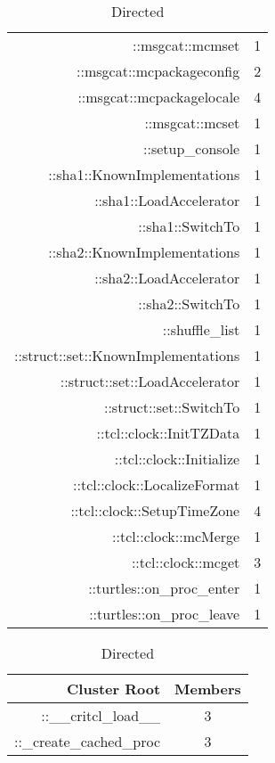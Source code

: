 \documentclass{article}[letter,10pt]
\begin{document}
{{{\begin{table}[htb]
\begin{subtable}[t]{0.48\textwidth}
{\begin{tabular}[t]{r|c}
              ::msgcat::mcmset  & 1 \\
              ::msgcat::mcpackageconfig  & 2 \\
              ::msgcat::mcpackagelocale  & 4 \\
              ::msgcat::mcset  & 1 \\
              ::setup\_console  & 1 \\
              ::sha1::KnownImplementations  & 1 \\
              ::sha1::LoadAccelerator  & 1 \\
              ::sha1::SwitchTo  & 1 \\
              ::sha2::KnownImplementations  & 1 \\
              ::sha2::LoadAccelerator  & 1 \\
              ::sha2::SwitchTo  & 1 \\
              ::shuffle\_list  & 1 \\
              ::struct::set::KnownImplementations  & 1 \\
              ::struct::set::LoadAccelerator  & 1 \\
              ::struct::set::SwitchTo  & 1 \\
              ::tcl::clock::InitTZData  & 1 \\
              ::tcl::clock::Initialize  & 1 \\
              ::tcl::clock::LocalizeFormat  & 1 \\
              ::tcl::clock::SetupTimeZone  & 4 \\
              ::tcl::clock::mcMerge  & 1 \\
              ::tcl::clock::mcget  &  3 \\
              ::turtles::on\_proc\_enter  & 1 \\
              ::turtles::on\_proc\_leave  & 1 \\
              \bottomrule
            \end{tabular}}
            \caption{Directed}
          \end{subtable}
          \begin{subtable}[t]{0.48\textwidth}
            {\footnotesize
            \begin{tabular}[t]{r|c}
              \toprule
              Cluster Root & Members \\
              \midrule
              ::\_\_critcl\_load\_\_  & 3 \\
              ::\_create\_cached\_proc  & 3 \\

\end{tabular}}
\end{subtable}
\end{table}}}}
\end{document}
